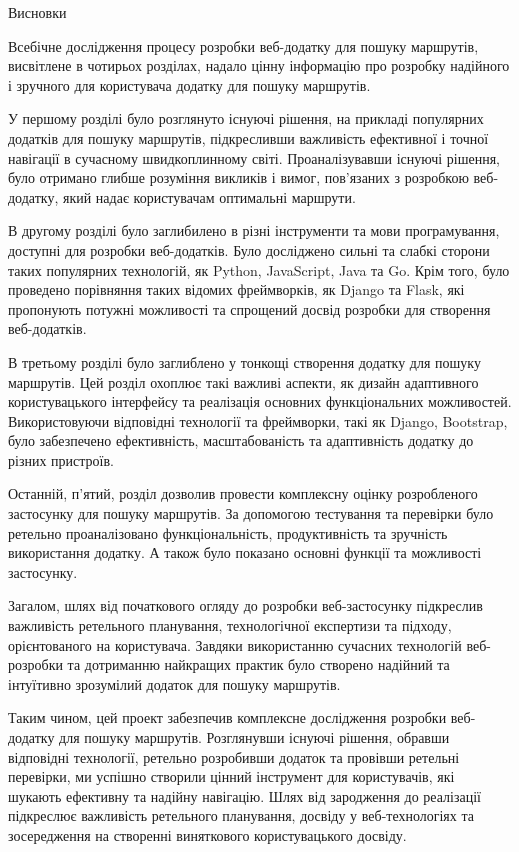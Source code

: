 \conclusions


Висновки

Всебічне дослідження процесу розробки веб-додатку для пошуку маршрутів, висвітлене в чотирьох розділах, надало цінну інформацію про розробку надійного і зручного для користувача додатку для пошуку маршрутів.

У першому розділі було розглянуто існуючі рішення, на прикладі популярних додатків для пошуку маршрутів, підкресливши важливість ефективної і точної навігації в сучасному швидкоплинному світі. Проаналізувавши існуючі рішення, було отримано глибше розуміння викликів і вимог, пов'язаних з розробкою веб-додатку, який надає користувачам оптимальні маршрути.

В другому розділі було заглибилено в різні інструменти та мови програмування, доступні для розробки веб-додатків. Було досліджено сильні та слабкі сторони таких популярних технологій, як Python, JavaScript, Java та Go. Крім того, було проведено порівняння таких відомих фреймворків, як Django та Flask, які пропонують потужні можливості та спрощений досвід розробки для створення веб-додатків.

В третьому розділі було заглиблено у тонкощі створення додатку для пошуку маршрутів. Цей розділ охоплює такі важливі аспекти, як дизайн адаптивного користувацького інтерфейсу та реалізація основних функціональних можливостей. Використовуючи відповідні технології та фреймворки, такі як Django, Bootstrap, було забезпечено ефективність, масштабованість та адаптивність додатку до різних пристроїв.

Останній, п'ятий, розділ дозволив провести комплексну оцінку розробленого застосунку для пошуку маршрутів. За допомогою тестування та перевірки було ретельно проаналізовано функціональність, продуктивність та зручність використання додатку. А також було показано основні функції та можливості застосунку.

Загалом, шлях від початкового огляду до розробки веб-застосунку підкреслив важливість ретельного планування, технологічної експертизи та підходу, орієнтованого на користувача. Завдяки використанню сучасних технологій веб-розробки та дотриманню найкращих практик було створено надійний та інтуїтивно зрозумілий додаток для пошуку маршрутів.

Таким чином, цей проект забезпечив комплексне дослідження розробки веб-додатку для пошуку маршрутів. Розглянувши існуючі рішення, обравши відповідні технології, ретельно розробивши додаток та провівши ретельні перевірки, ми успішно створили цінний інструмент для користувачів, які шукають ефективну та надійну навігацію. Шлях від зародження до реалізації підкреслює важливість ретельного планування, досвіду у веб-технологіях та зосередження на створенні виняткового користувацького досвіду.